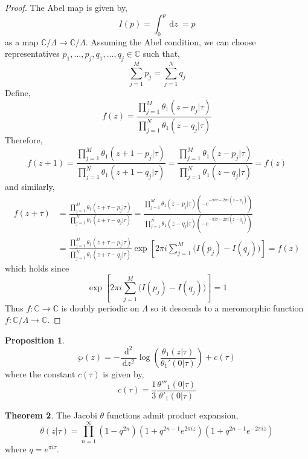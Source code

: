 \documentclass[12pt]{extarticle}
\newcommand{\C}{\mathbb{C}}
\renewcommand{\d}[1]{\: \mathrm{d}#1 \:}
\newcommand{\dn}[2]{\: \mathrm{d}^{#1} #2 \:}
\newcommand{\nderiv}[3]{\frac{\dn{#1}{#2}}{\d{#3^2}}}
\theoremstyle{definition}
\newtheorem{theorem}{Theorem}[section]
\newtheorem{proposition}[theorem]{Proposition}
\begin{document}
\begin{proof}
The Abel map is given by,
\[ I(p) = \int_0^p \d{z} = p \]
as a map $\C / \Lambda \to \C / \Lambda$. Assuming the Abel condition, we can choose representatives $p_1, \dots, p_j, q_1, \dots, q_j \in \C$ such that,
\[ \sum_{j = 1}^M p_j = \sum_{j = 1}^N q_j \]
Define,
\[ f(z) = \frac{\prod_{j = 1}^M \theta_1(z - p_j| \tau)}{\prod_{j = 1}^N \theta_1(z - q_j | \tau)} \]
Therefore,
\[ f(z + 1) = \frac{\prod_{j = 1}^M \theta_1(z + 1 - p_j| \tau)}{\prod_{j = 1}^N \theta_1(z + 1 - q_j | \tau)} = \frac{\prod_{j = 1}^M \theta_1(z - p_j| \tau)}{\prod_{j = 1}^N \theta_1(z - q_j | \tau)}  = f(z) \]
and similarly,
\begin{align*}
f(z + \tau) & = \frac{\prod_{j = 1}^M \theta_1(z + \tau - p_j| \tau)}{\prod_{j = 1}^N \theta_1(z + \tau - q_j | \tau)} = \frac{\prod_{j = 1}^M \theta_1(z - p_j| \tau) \left( - e^{- \pi i \tau - 2 \pi i (z - p_j)} \right)}{\prod_{j = 1}^N \theta_1(z - q_j | \tau)\left( - e^{- \pi i \tau - 2 \pi i (z - q_j)} \right)} 
\\
& = \frac{\prod_{j = 1}^M \theta_1(z + \tau - p_j| \tau)}{\prod_{j = 1}^N \theta_1(z + \tau - q_j | \tau)} \exp{\left[ 2\pi i \sum_{j = 1}^M \bigg( I(p_j) - I(q_j) \bigg) \right]} = f(z)
\end{align*}
which holds since 
\[ \exp{\left[ 2\pi i \sum_{j = 1}^M \bigg( I(p_j) - I(q_j) \bigg) \right]} = 1 \]
Thus $f : \C \to \C$ is doubly periodic on $\Lambda$ so it descends to a meromorphic function $f : \C / \Lambda \to \C$. 
\end{proof}

\begin{proposition}
\[ \wp(z) = - \nderiv{2}{}{z} \log{\left( \frac{\theta_1(z | \tau)}{\theta_1'(0 | \tau)} \right)} + c(\tau) \]
where the constant $c(\tau)$ is given by,
\[ c(\tau) = \frac{1}{3} \frac{\theta'''_1(0 | \tau)}{\theta'_1(0 | \tau)} \]
\end{proposition}

\begin{theorem}
The Jacobi $\theta$ functions admit product expansion,
\[ \theta(z | \tau) = \prod_{n = 1}^\infty (1 - q^{2n}) \left(1 + q^{2n - 1} e^{2 \pi i z} \right) \left(1 + q^{2n - 1} e^{-2 \pi i z} \right)\]
where $q = e^{\pi i \tau}$. 
\end{theorem}
\end{document}
